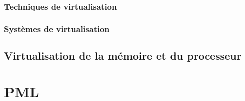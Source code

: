 \subsubsection{Techniques de virtualisation}

\subsubsection{Systèmes de virtualisation}

\subsection{Virtualisation de la mémoire et du processeur}

\section{PML}